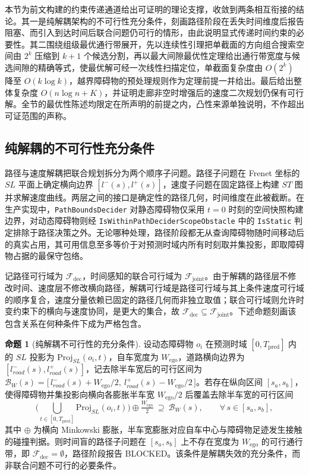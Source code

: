 \documentclass[a4paper,11pt]{ctexart}
\theoremstyle{definition}
\newtheorem{proposition}{命题}[section]
\begin{document}
本节为前文构建的约束传递通道给出可证明的理论支撑，收敛到两条相互衔接的结论。其一是纯解耦架构的不可行性充分条件，刻画路径阶段在丢失时间维度后报告阻塞、而引入到达时间后联合问题仍可行的情形，由此说明显式传递时间约束的必要性。其二围绕组级最优通行带展开，先以连续性引理把单截面的方向组合搜索空间由 $2^k$ 压缩到 $k+1$ 个候选分割，再以最大间隙最优性定理给出通行带宽度与候选间隙的精确等式，使最优解可经一次线性扫描定位，单截面复杂度由 $O(2^k)$ 降至 $O(k\log k)$，越界障碍物的预处理规则作为定理前提一并给出。最后给出整体复杂度 $O(n\log n + K)$，并证明走廊非空时增强后的速度二次规划仍保有可行解。全节的最优性陈述均限定在所声明的前提之内，凸性来源单独说明，不作超出可证范围的声称。

\subsection{纯解耦的不可行性充分条件}
\label{sec:thy_infeasible}

路径与速度解耦把联合规划拆分为两个顺序子问题。路径子问题在 Frenet 坐标的 $SL$ 平面上确定横向边界 $[l^{-}(s), l^{+}(s)]$，速度子问题在固定路径上构建 $ST$ 图并求解速度曲线。两层之间的接口是确定性的路径几何，时间维度在此被截断。在生产实现中，\texttt{PathBoundsDecider} 对静态障碍物仅采用 $t{=}0$ 时刻的空间快照构建边界，对动态障碍物则经 \texttt{IsWithinPathDeciderScopeObstacle} 中的 \texttt{IsStatic} 判定排除于路径决策之外。无论哪种处理，路径阶段都无从查询障碍物随时间移动后的真实占用，其可用信息至多等价于对预测时域内所有时刻取并集投影，即取障碍物占据的最保守包络。

记路径可行域为 $\mathcal{F}_{\text{dec}}$，时间感知的联合可行域为 $\mathcal{F}_{\text{joint}}$。由于解耦的路径层不修改时间、速度层不修改横向路径，解耦可行域是路径可行域与其上条件速度可行域的顺序复合，速度分量依赖已固定的路径几何而非独立取值；联合可行域则允许时变约束下的横向与速度协同，是更大的集合，故 $\mathcal{F}_{\text{dec}} \subseteq \mathcal{F}_{\text{joint}}$。下述命题刻画该包含关系在何种条件下成为严格包含。

\begin{proposition}[纯解耦不可行性的充分条件]
\label{prop:decoupled_infeasible}
设动态障碍物 $o_i$ 在预测时域 $[0, T_{\text{pred}}]$ 内的 $SL$ 投影为 $\mathrm{Proj}_{SL}(o_i, t)$，自车宽度为 $W_{\text{ego}}$，道路横向边界为 $[l_{road}^{-}(s), l_{road}^{+}(s)]$，记去除半车宽后的可行区间为 $\mathcal{B}_{W}(s) = \bigl[\, l_{road}^{-}(s) + W_{\text{ego}}/2,\ l_{road}^{+}(s) - W_{\text{ego}}/2 \,\bigr]$。若存在纵向区间 $[s_a, s_b]$，使得障碍物并集投影向横向各膨胀半车宽 $W_{\text{ego}}/2$ 后覆盖去除半车宽的可行区间
\begin{equation}
    \Big(\bigcup_{t \in [0, T_{\text{pred}}]} \mathrm{Proj}_{SL}(o_i, t)\Big) \oplus \tfrac{W_{\text{ego}}}{2}\ \supseteq\ \mathcal{B}_{W}(s), \qquad \forall\, s \in [s_a, s_b],
    \label{eq:thy_infeasible_cond}
\end{equation}
其中 $\oplus$ 为横向 Minkowski 膨胀，半车宽膨胀对应自车中心与障碍物足迹发生接触的碰撞判据。则时间盲的路径子问题在 $[s_a, s_b]$ 上不存在宽度为 $W_{\text{ego}}$ 的可行通行带，即 $\mathcal{F}_{\text{dec}} = \emptyset$，路径阶段报告 BLOCKED。该条件是解耦失效的充分条件，而非联合问题不可行的必要条件。
\end{proposition}
\end{document}
